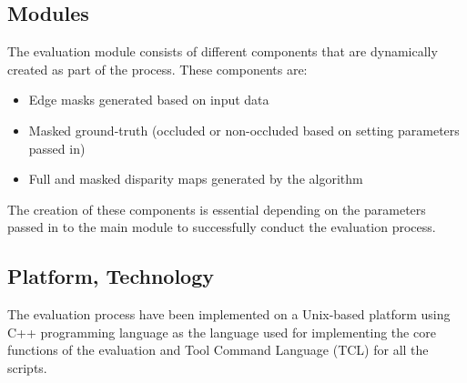 \subsection{Modules}
The evaluation module consists of different components that are dynamically created as part of the process. These components are:

\begin{itemize}
\item Edge masks generated based on input data 
\item Masked ground-truth (occluded or non-occluded based on setting parameters passed in)
\item Full and masked disparity maps generated by the algorithm 
\end{itemize}

The creation of these components is essential depending on the parameters passed in to the main module to successfully conduct 
the evaluation process.

\subsection{Platform, Technology}
The evaluation process have been implemented on a Unix-based platform using C++ programming language as the language used for implementing 
the core functions of the evaluation and Tool Command Language (TCL) for all the scripts.
